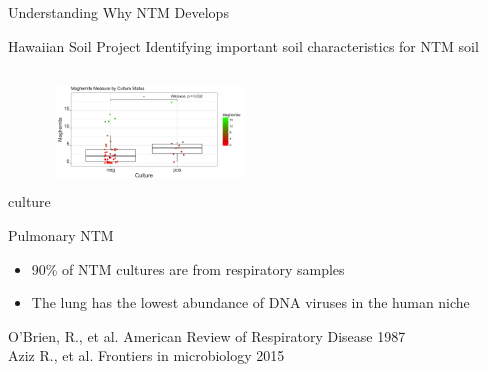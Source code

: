 \documentclass[11pt]{beamer}
\begin{document}
	\begin{frame}{Understanding Why NTM Develops}
	\begin{block}{Hawaiian Soil Project}
	Identifying important soil characteristics for NTM soil culture 
	\center
	\includegraphics[height=4cm, width=5cm]{soil.jpeg}
	
	\end{block}
	\vspace{-0.5cm}
	\begin{block}{Pulmonary NTM}
	\vspace{-0.3cm}
	\begin{itemize}
	\item 90\% of NTM cultures are from respiratory samples
	\item The lung has the lowest abundance of DNA viruses in the human niche
	\end{itemize}
	\end{block}
	
	
	
	\tiny{O'Brien, R., et al. American Review of Respiratory Disease 1987 \\ Aziz R., et al. Frontiers in microbiology 2015}

	
	\end{frame}
	
\end{document}
